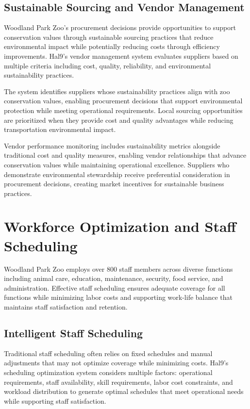\documentclass[
  Letterpaper,
]{scrbook}
\begin{document}
\subsection{Sustainable Sourcing and Vendor
Management}\label{sustainable-sourcing-and-vendor-management}

Woodland Park Zoo's procurement decisions provide opportunities to
support conservation values through sustainable sourcing practices that
reduce environmental impact while potentially reducing costs through
efficiency improvements. Hal9's vendor management system evaluates
suppliers based on multiple criteria including cost, quality,
reliability, and environmental sustainability practices.

The system identifies suppliers whose sustainability practices align
with zoo conservation values, enabling procurement decisions that
support environmental protection while meeting operational requirements.
Local sourcing opportunities are prioritized when they provide cost and
quality advantages while reducing transportation environmental impact.

Vendor performance monitoring includes sustainability metrics alongside
traditional cost and quality measures, enabling vendor relationships
that advance conservation values while maintaining operational
excellence. Suppliers who demonstrate environmental stewardship receive
preferential consideration in procurement decisions, creating market
incentives for sustainable business practices.

\section{Workforce Optimization and Staff
Scheduling}\label{workforce-optimization-and-staff-scheduling}

Woodland Park Zoo employs over 800 staff members across diverse
functions including animal care, education, maintenance, security, food
service, and administration. Effective staff scheduling ensures adequate
coverage for all functions while minimizing labor costs and supporting
work-life balance that maintains staff satisfaction and retention.

\subsection{Intelligent Staff
Scheduling}\label{intelligent-staff-scheduling}

Traditional staff scheduling often relies on fixed schedules and manual
adjustments that may not optimize coverage while minimizing costs.
Hal9's scheduling optimization system considers multiple factors:
operational requirements, staff availability, skill requirements, labor
cost constraints, and workload distribution to generate optimal
schedules that meet operational needs while supporting staff
satisfaction.
\end{document}
